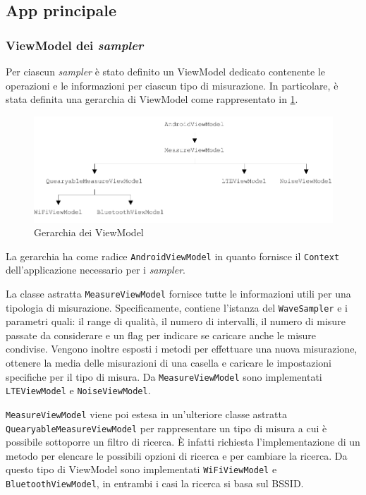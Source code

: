 \subsection{App principale}

\subsubsection{ViewModel dei \textit{sampler}} \label{sec:MeasureViewModel}
Per ciascun \textit{sampler} è stato definito un ViewModel dedicato contenente le operazioni e le informazioni per ciascun tipo di misurazione.
In particolare, è stata definita una gerarchia di ViewModel come rappresentato in \cref{fig:viewmodel_hierarchy}.

\begin{figure}[H]
  \centering
  \includegraphics[width=\textwidth]{./img/viewmodel.pdf}
  \caption{Gerarchia dei ViewModel} \label{fig:viewmodel_hierarchy}
\end{figure}

La gerarchia ha come radice \texttt{AndroidViewModel} in quanto fornisce il \texttt{Context} dell'applicazione necessario per i \textit{sampler}.

La classe astratta \texttt{MeasureViewModel} fornisce tutte le informazioni utili per una tipologia di misurazione. Specificamente, contiene l'istanza del \texttt{WaveSampler} e i parametri quali: il range di qualità, il numero di intervalli, il numero di misure passate da considerare e un flag per indicare se caricare anche le misure condivise.
Vengono inoltre esposti i metodi per effettuare una nuova misurazione, ottenere la media delle misurazioni di una casella e caricare le impostazioni specifiche per il tipo di misura.
Da \texttt{MeasureViewModel} sono implementati \texttt{LTEViewModel} e \texttt{NoiseViewModel}.

\texttt{MeasureViewModel} viene poi estesa in un'ulteriore classe astratta \texttt{QuearyableMeasureViewModel} per rappresentare un tipo di misura a cui è possibile sottoporre un filtro di ricerca. È infatti richiesta l'implementazione di un metodo per elencare le possibili opzioni di ricerca e per cambiare la ricerca. Da questo tipo di ViewModel sono implementati \texttt{WiFiViewModel} e \texttt{BluetoothViewModel}, in entrambi i casi la ricerca si basa sul BSSID.


